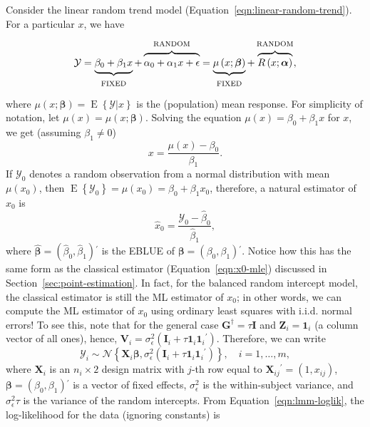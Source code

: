 \documentclass[cmfont,usenames,dvipsnames,leqno]{afit-etd}\usepackage[]{graphicx}\usepackage[]{color}
\newcommand{\trans}{\ensuremath{^\prime}}
\newcommand{\bc}[1]{\ensuremath{\bm{\mathcal{#1}}}}
\newcommand{\mc}[1]{\ensuremath{\mathcal{#1}}}
\newcommand{\wh}[1]{\ensuremath{\widehat{#1}}}
\newcommand{\E}{\operatorname{E}}
\newcommand{\X}{\ensuremath{\bm{X}}}
\newcommand{\Z}{\ensuremath{\bm{Z}}}
\begin{document}
Consider the linear random trend model (Equation~\eqref{eqn:linear-random-trend}). For a particular $x$, we have
\begin{equation*}
  \mc{Y} = \underbrace{\strut \beta_0 + \beta_1 x}_\text{\strut FIXED} + \overbrace{\strut \alpha_0 + \alpha_1 x + \epsilon}^\text{\strut RANDOM} = \underbrace{\strut \mu\left(x; \bm{\beta}\right)}_\text{\strut FIXED} + \overbrace{\strut R\left(x; \bm{\alpha}\right)}^\text{\strut RANDOM},
\end{equation*}
where $\mu\left(x; \bm{\beta}\right) = \E\left\{\mc{Y}|x\right\}$ is the (population) mean response. For simplicity of notation, let $\mu\left(x\right) = \mu\left(x; \bm{\beta}\right)$. Solving the equation $\mu(x) = \beta_0 + \beta_1 x$ for $x$, we get (assuming $
\beta_1 \ne 0$)
\begin{equation*}
  x = \frac{\mu(x) - \beta_0}{\beta_1}.
\end{equation*}
If $\mc{Y}_0$ denotes a random observation from a normal distribution with mean $\mu(x_0)$, then $\E\left\{\mc{Y}_0\right\} = \mu(x_0) = \beta_0 + \beta_1 x_0$, therefore, a natural estimator of $x_0$ is
\begin{equation}
\label{eqn:calibration-lmm-mle}
  \wh{x}_0 = \frac{\mc{Y}_0 - \wh{\beta}_0}{\wh{\beta}_1},
\end{equation}
where $\wh{\bm{\beta}} = \left(\wh{\beta}_0, \wh{\beta}_1\right)\trans$ is the \ac{EBLUE} of $\bm{\beta} = \left(\beta_0, \beta_1\right)\trans$. Notice how this has the same form as the classical estimator (Equation~\eqref{eqn:x0-mle}) discussed in Section~\ref{sec:point-estimation}. In fact, for the balanced random intercept model, the classical estimator is still the \ac{ML} estimator of $x_0$; in other words, we can compute the \ac{ML} estimator of $x_0$ using ordinary least squares with i.i.d. normal errors! To see this, note that for the general case $\bm{G}^\dagger = \tau\bm{I}$ and $\Z_i = \bm{1}_i$ (a column vector of all ones), hence, $\bm{V}_i = \sigma_\epsilon^2\left(\bm{I}_i + \tau\bm{1}_i\bm{1}_i\trans\right)$. Therefore, we can write
\begin{equation*}
  \bc{Y}_i \sim \mc{N}\left\{\X_i\bm{\beta}, \sigma_\epsilon^2\left(\bm{I}_i + \tau\bm{1}_i\bm{1}_i\trans\right)\right\}, \quad i = 1, \dotsc, m,
\end{equation*}
where $\X_i$ is an $n_i \times 2$ design matrix with $j$-th row equal to $\X_{ij}\trans = \left(1, x_{ij}\right)$, $\bm{\beta} = \left(\beta_0, \beta_1\right)\trans$ is a vector of fixed effects, $\sigma_\epsilon^2$ is the within-subject variance, and $\sigma_\epsilon^2\tau$ is the variance of the random intercepts. From Equation~\eqref{eqn:lmm-loglik}, the log-likelihood for the data (ignoring constants) is
\end{document}
